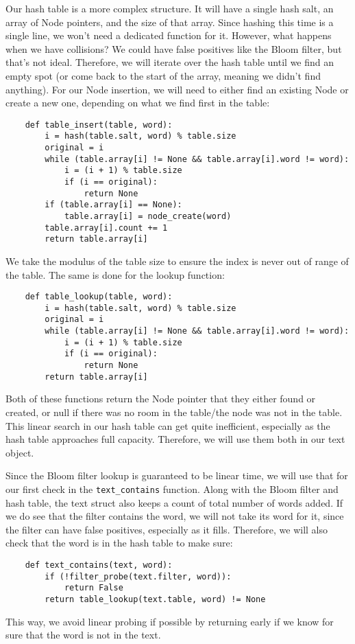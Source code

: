 \documentclass[12pt]{article}
\begin{document}
Our hash table is a more complex structure. It will have a single hash salt, an array of Node pointers, and the size of that array. Since hashing this time is a single line, we won't need a dedicated function for it. However, what happens when we have collisions? We could have false positives like the Bloom filter, but that's not ideal. Therefore, we will iterate over the hash table until we find an empty spot (or come back to the start of the array, meaning we didn't find anything). For our Node insertion, we will need to either find an existing Node or create a new one, depending on what we find first in the table:
\begin{verbatim}
    def table_insert(table, word):
        i = hash(table.salt, word) % table.size
        original = i
        while (table.array[i] != None && table.array[i].word != word):
            i = (i + 1) % table.size
            if (i == original):
                return None
        if (table.array[i] == None):
            table.array[i] = node_create(word)
        table.array[i].count += 1
        return table.array[i]
\end{verbatim}
We take the modulus of the table size to ensure the index is never out of range of the table. The same is done for the lookup function:
\begin{verbatim}
    def table_lookup(table, word):
        i = hash(table.salt, word) % table.size
        original = i
        while (table.array[i] != None && table.array[i].word != word):
            i = (i + 1) % table.size
            if (i == original):
                return None
        return table.array[i]
\end{verbatim}
Both of these functions return the Node pointer that they either found or created, or null if there was no room in the table/the node was not in the table. This linear search in our hash table can get quite inefficient, especially as the hash table approaches full capacity. Therefore, we will use them both in our text object.

Since the Bloom filter lookup is guaranteed to be linear time, we will use that for our first check in the \verb|text_contains| function. Along with the Bloom filter and hash table, the text struct also keeps a count of total number of words added. If we do see that the filter contains the word, we will not take its word for it, since the filter can have false positives, especially as it fills. Therefore, we will also check that the word is in the hash table to make sure:
\begin{verbatim}
    def text_contains(text, word):
        if (!filter_probe(text.filter, word)):
            return False
        return table_lookup(text.table, word) != None
\end{verbatim}
This way, we avoid linear probing if possible by returning early if we know for sure that the word is not in the text.
\end{document}
